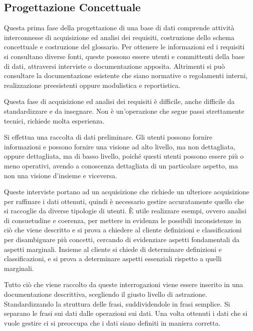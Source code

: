 \documentclass{article}
\numberwithin{equation}{subsection}
\begin{document}
\subsection{Progettazione Concettuale}

Questa prima fase della progettazione di una base di dati comprende attività interconnesse di acquisizione ed analisi dei requisiti, costruzione dello schema concettuale e costruzione del glossario. 
Per ottenere le informazioni ed i requisiti si consultano diverse fonti, queste possono essere utenti e committenti della base di dati, attraversi interviste o documentazione apposita. Altrimenti si può 
consultare la documentazione esistente che siano normative o regolamenti interni, realizzazione preesistenti oppure modulistica e reportistica. 

Questa fase di acquisizione ed analisi dei requisiti è difficile, anche difficile da standardizzare e da insegnare. Non è un'operazione che segue 
passi strettamente tecnici, richiede molta esperienza. 


Si effettua una raccolta di dati preliminare. Gli utenti possono fornire informazioni e possono fornire una visione ad alto livello, ma non dettagliata, oppure 
dettagliata, ma di basso livello, poiché questi utenti possono essere più o meno operativi, avendo a conoscenza dettagliata di un particolare aspetto, ma non una visione d'insieme e viceversa. 

Queste interviste portano ad un acquisizione che richiede un ulteriore acquisizione per raffinare i dati ottenuti, quindi è necessario gestire accuratamente quello che 
si raccoglie da diverse tipologie di utenti. \`{E} utile realizzare esempi, ovvero analisi 
di consuetudine e coerenza, per mettere in evidenza le possibili inconsistenze in ciò che viene descritto e si prova a chiedere al cliente definizioni e classificazioni per disambiguare più concetti, cercando di 
evidenziare aspetti fondamentali da aspetti marginali. 
Insieme al cliente si chiede di determinare definizioni e classificazioni, e si prova a determinare aspetti essenziali rispetto a quelli marginali. 

Tutto ciò che viene raccolto da queste interrogazioni viene essere inserito in una documentazione descrittiva, scegliendo il giusto livello di astrazione. 
Standardizzando la struttura delle frasi, suddividendole in frasi semplice. Si separano le frasi sui dati dalle operazioni sui dati. Una volta ottenuti i dati che si vuole gestire ci si 
preoccupa che i dati siano definiti in maniera corretta. 
\end{document}
